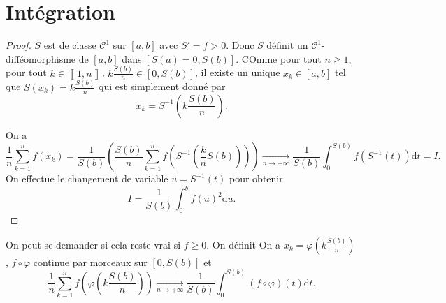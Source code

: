 \section{Intégration}

\begin{proof}
    $S$ est de classe $\mathcal{C}^{1}$ sur $[a,b]$ avec $S'=f>0$. Donc $S$ définit un $\mathcal{C}^{1}$-difféomorphisme de $[a,b]$ dans $[S(a)=0,S(b)]$. COmme pour tout $n\geqslant1$, pour tout $k\in\left\llbracket1,n\right\rrbracket$, $k\frac{S(b)}{n}\in[0,S(b)]$, il existe un unique $x_{k}\in[a,b]$ tel que $S(x_{k})=k\frac{S(b)}{n}$ qui est simplement donné par 
    \begin{equation}
        \boxed{
            x_{k}=S^{-1}\left(k\frac{S(b)}{n}\right).
        }
    \end{equation}

    On a 
    \begin{equation}
        \frac{1}{n}\sum_{k=1}^{n}f(x_{k})=\frac{1}{S(b)}\left(\frac{S(b)}{n}\sum_{k=1}^{n}f\left(S^{-1}\left(\frac{k}{n}S(b)\right)\right)\right)\xrightarrow[n\to+\infty]{}\frac{1}{S(b)}\int_{0}^{S(b)}f\left(S^{-1}(t)\right)\mathrm{d}t=I.
    \end{equation}
    On effectue le changement de variable $u=S^{-1}(t)$ pour obtenir
    \begin{equation}
        \boxed{
            I=\frac{1}{S(b)}\int_{0}^{b}f(u)^{2}\mathrm{d}u.
        }
    \end{equation}
\end{proof}

\begin{remark}
    On peut se demander si cela reste vrai si $f\geqslant0$. On définit 
    On a $x_{k}=\varphi\left(k\frac{S(b)}{n}\right)$, $f\circ \varphi$ continue par morceaux sur $[0,S(b)]$ et 
    \begin{equation}
        \frac{1}{n}\sum_{k=1}^{n}f\left(\varphi\left(k\frac{S(b)}{n}\right)\right)\xrightarrow[n\to+\infty]{}\frac{1}{S(b)}\int_{0}^{S(b)}\left(f\circ \varphi\right)(t)\mathrm{d}t.
    \end{equation}
\end{remark}

